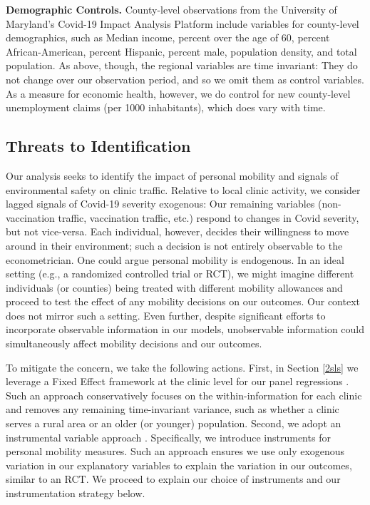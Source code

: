  \noindent \textbf{Demographic Controls.} County-level observations from the University of Maryland’s Covid-19 Impact Analysis Platform include variables for county-level demographics, such as Median income, percent over the age of 60,  percent African-American, percent Hispanic, percent male, population density, and total population. As above, though, the regional variables are time invariant: They do not change over our observation period, and so we omit them as control variables. As a measure for economic health, however, we do control for new county-level unemployment claims (per 1000 inhabitants), which does vary with time. 

\subsection{Threats to Identification}
 Our analysis seeks to identify the impact of personal mobility and signals of environmental safety on clinic traffic. Relative to local clinic activity, we consider lagged signals of Covid-19 severity exogenous: Our remaining variables (non-vaccination traffic, vaccination traffic, etc.) respond to changes in Covid severity, but not vice-versa. Each individual, however, decides their willingness to move around in their environment; such a decision is not entirely observable to the econometrician. One could argue personal mobility is endogenous. In an ideal setting (e.g., a randomized controlled trial or RCT), we might imagine different individuals (or counties) being treated with different mobility allowances and proceed to test the effect of any mobility decisions on our outcomes. Our context does not mirror such a setting. Even further, despite significant efforts to incorporate observable information in our models, unobservable information could simultaneously affect mobility decisions and our outcomes.  
 
 To mitigate the concern, we take the following actions. First, in Section \ref{2sls} we leverage a Fixed Effect framework at the clinic level for our panel regressions \citep{Wooldridge2010}. Such an approach conservatively focuses on the within-information for each clinic and removes any remaining time-invariant variance, such as whether a clinic serves a rural area or an older (or younger) population. Second, we adopt an instrumental variable approach \citep[ch. 4]{Angrist2009}. Specifically, we introduce instruments for personal mobility measures. Such an approach ensures we use only exogenous variation in our explanatory variables to explain the variation in our outcomes, similar to an RCT. We proceed to explain our choice of instruments and our instrumentation strategy below.
 

